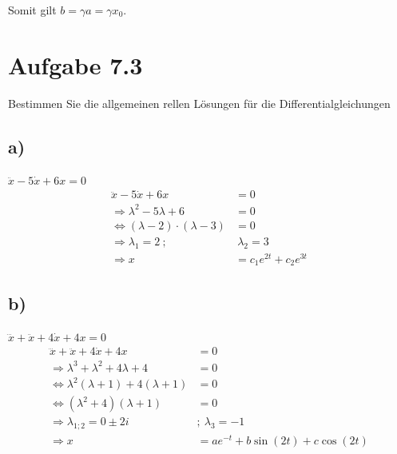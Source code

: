 \documentclass{theozettel}
\begin{document}
Somit gilt $b = \gamma a = \gamma x_0$.



\section*{Aufgabe 7.3} 
Bestimmen Sie die allgemeinen rellen Lösungen für die Differentialgleichungen
\subsection*{a)} $\ddot{x}-5\dot{x}+6x=0$
\begin{align*}
\ddot{x}-5\dot{x}+6x&=0\\
\Rightarrow\lambda^2-5\lambda+6&=0\\
\Leftrightarrow\left(\lambda-2\right)\cdot\left(\lambda-3\right)&=0\\
\Rightarrow\lambda_1=2 \ ;& \ \lambda_2=3\\
\Rightarrow x&=c_1e^{2t}+c_2e^{3t}
\end{align*}
\subsection*{b)}$\dddot{x}+\ddot{x}+4\dot{x}+4x=0$
\begin{align*}
\dddot{x}+\ddot{x}+4\dot{x}+4x&=0\\
\Rightarrow \lambda^3+\lambda^2+4\lambda+4&=0\\
\Leftrightarrow \lambda^2\left(\lambda+1\right)+4\left(\lambda+1\right)&=0\\
\Leftrightarrow\left(\lambda^2+4\right)\left(\lambda+1\right)&=0\\
\Rightarrow \lambda_{1;2}=0\pm 2i \ &; \ \lambda_3=-1\\
\Rightarrow x&=ae^{-t}+b\sin\left(2t\right)+c\cos\left(2t\right)
\end{align*}
\end{document}

